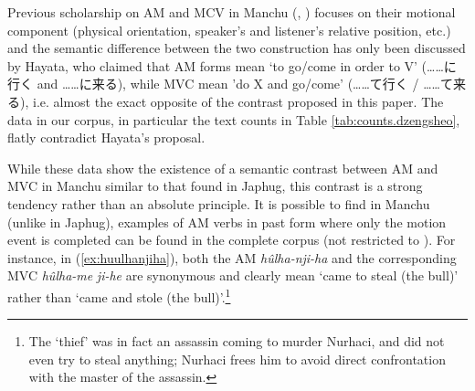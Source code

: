 \documentclass{article}
\newcommand{\ipa}[1]{\textit{{\phon\mbox{#1}}}} %
\newcommand{\zh}[1]{{\cn#1}}
\begin{document}
Previous scholarship on AM and MCV in Manchu (\citealt{hayata95yuku}, \citealt{kubo97come}) focuses on their motional component (physical orientation, speaker’s and listener’s relative position, etc.) and the semantic difference between the two construction has only been discussed by Hayata, who claimed that AM forms mean ‘to go/come in order to V’ (\zh{……に行く} and \zh{……に来る}), while MVC mean 'do X and go/come' (\zh{……て行く} / \zh{……て来る}), i.e. almost the exact opposite of the contrast proposed in this paper. The data in our corpus, in particular the text counts in Table \ref{tab:counts.dzengsheo}, flatly contradict Hayata's proposal.

While these data show the existence of a semantic contrast between AM and MVC in Manchu similar to that found in Japhug, this contrast is a strong tendency rather than an absolute principle. It is possible to find in Manchu (unlike in Japhug), examples of AM verbs in past form where only the motion event is completed can be found in the complete corpus (not restricted to \citet{cosmo06dzengseo}). For instance,  in (\ref{ex:huulhanjiha}), both the AM \ipa{hûlha-nji-ha} and the corresponding MVC \ipa{hûlha-me} \ipa{ji-he} are synonymous and clearly mean `came to steal (the bull)' rather than `came and stole (the bull)'.\footnote{The `thief' was in fact an assassin coming to murder Nurhaci, and did not even try to steal anything; Nurhaci frees him to avoid direct confrontation with the master of the assassin.}
\end{document}
